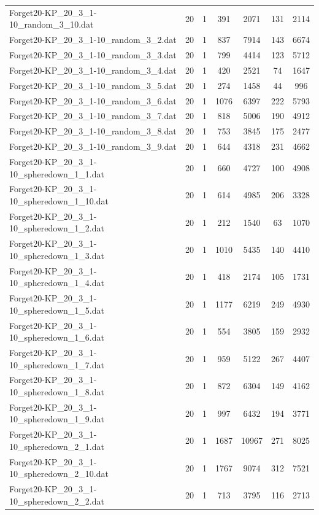 \begin{table}[!ht]
\begin{tabular}{lcccccc}
Forget20-KP\_20\_3\_1-10\_random\_3\_10.dat & 20 & 1 & 391 & 2071 & 131 & 2114 \\
Forget20-KP\_20\_3\_1-10\_random\_3\_2.dat & 20 & 1 & 837 & 7914 & 143 & 6674 \\
Forget20-KP\_20\_3\_1-10\_random\_3\_3.dat & 20 & 1 & 799 & 4414 & 123 & 5712 \\
Forget20-KP\_20\_3\_1-10\_random\_3\_4.dat & 20 & 1 & 420 & 2521 & 74 & 1647 \\
Forget20-KP\_20\_3\_1-10\_random\_3\_5.dat & 20 & 1 & 274 & 1458 & 44 & 996 \\
Forget20-KP\_20\_3\_1-10\_random\_3\_6.dat & 20 & 1 & 1076 & 6397 & 222 & 5793 \\
Forget20-KP\_20\_3\_1-10\_random\_3\_7.dat & 20 & 1 & 818 & 5006 & 190 & 4912 \\
Forget20-KP\_20\_3\_1-10\_random\_3\_8.dat & 20 & 1 & 753 & 3845 & 175 & 2477 \\
Forget20-KP\_20\_3\_1-10\_random\_3\_9.dat & 20 & 1 & 644 & 4318 & 231 & 4662 \\
Forget20-KP\_20\_3\_1-10\_spheredown\_1\_1.dat & 20 & 1 & 660 & 4727 & 100 & 4908 \\
Forget20-KP\_20\_3\_1-10\_spheredown\_1\_10.dat & 20 & 1 & 614 & 4985 & 206 & 3328 \\
Forget20-KP\_20\_3\_1-10\_spheredown\_1\_2.dat & 20 & 1 & 212 & 1540 & 63 & 1070 \\
Forget20-KP\_20\_3\_1-10\_spheredown\_1\_3.dat & 20 & 1 & 1010 & 5435 & 140 & 4410 \\
Forget20-KP\_20\_3\_1-10\_spheredown\_1\_4.dat & 20 & 1 & 418 & 2174 & 105 & 1731 \\
Forget20-KP\_20\_3\_1-10\_spheredown\_1\_5.dat & 20 & 1 & 1177 & 6219 & 249 & 4930 \\
Forget20-KP\_20\_3\_1-10\_spheredown\_1\_6.dat & 20 & 1 & 554 & 3805 & 159 & 2932 \\
Forget20-KP\_20\_3\_1-10\_spheredown\_1\_7.dat & 20 & 1 & 959 & 5122 & 267 & 4407 \\
Forget20-KP\_20\_3\_1-10\_spheredown\_1\_8.dat & 20 & 1 & 872 & 6304 & 149 & 4162 \\
Forget20-KP\_20\_3\_1-10\_spheredown\_1\_9.dat & 20 & 1 & 997 & 6432 & 194 & 3771 \\
Forget20-KP\_20\_3\_1-10\_spheredown\_2\_1.dat & 20 & 1 & 1687 & 10967 & 271 & 8025 \\
Forget20-KP\_20\_3\_1-10\_spheredown\_2\_10.dat & 20 & 1 & 1767 & 9074 & 312 & 7521 \\
Forget20-KP\_20\_3\_1-10\_spheredown\_2\_2.dat & 20 & 1 & 713 & 3795 & 116 & 2713 \\

\end{tabular}
\end{table}
